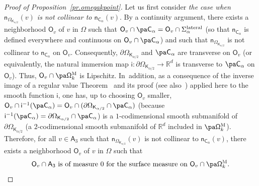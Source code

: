 \begin{proof}[Proof of Proposition~\ref{pr.omegakpoint}]
Let us first consider \emph{the case when $\mathsf n_{\Omega_{\mathsf K_{\alpha/2}}}(v)$ is not collinear to $\mathsf n_{\mathsf C_\alpha}(v)$}. By a continuity argument, there exists a neighborhood $\mathsf O_v$ of $v$ in $\Omega$ such that $\mathsf O_v\cap \pa \mathsf C_\alpha=\mathsf O_v\cap \Sigma_\alpha^{\textup{lateral}}$ (so that $\mathsf n_{\mathsf C_\alpha}$ is defined everywhere and continuous on $\mathsf O_v\cap \pa \mathsf C_\alpha$) and such that $\mathsf n_{\Omega_{\mathsf K_{\alpha/2}}}$ is not collinear to $\mathsf n_{\mathsf C_\alpha}$ on $\mathsf O_v$. Consequently, $ \partial \Omega_{\mathsf K_{\alpha/2}}$ and $ \pa \mathsf C_\alpha$ are transverse on $\mathsf O_v$ (or equivalently, the natural immersion map $\mathsf i: \partial \Omega_{\mathsf K_{\alpha/2}}\to \mathbb R^d$ is transverse to $ \pa \mathsf C_\alpha$ on $\mathsf O_v$). Thus, $\mathsf O_v\cap \pa \mathsf \Omega_k^{\textsc{M}}$ is Lipschitz. In~addition, as a consequence of the inverse image of a regular value Theorem~\cite[Th.\,(5.12)]{brocker1982introduction} and its proof (see also~\cite{thom1954quelques,milnor1997topology,guillemin2010differential})
applied here to the smooth function $\mathsf i$, one has, up to choosing $\mathsf O_v$ smaller, $\mathsf O_v \cap \mathsf i^{-1}(\pa \mathsf C_\alpha)= \mathsf O_v\cap (\partial \Omega_{\mathsf K_{\alpha/2}}\cap \pa \mathsf C_\alpha)$ (because $\mathsf i^{-1}(\pa \mathsf C_\alpha)= \partial \Omega_{\mathsf K_{\alpha/2}}\cap \pa \mathsf C_\alpha$) is a $1$-codimensional smooth submanifold of $\partial \Omega_{\mathsf K_{\alpha/2}}$ (\ie a $2$-codimensional smooth submanifold of $\mathbb R^d$ included in $\pa \mathsf \Omega_k^{\textsc{M}}$).
Therefore, for all $v\in \mathsf A_3$ such that $\mathsf n_{\Omega_{\mathsf K_{\alpha/2}}}(v)$ is not collinear to $\mathsf n_{\mathsf C_\alpha}(v)$, there exists a neighborhood $\mathsf O_v$ of $v$ in $\Omega$ such that
\begin{equation}\label{eq.point1A3}
\text{$\mathsf O_v\cap \mathsf A_3$ is of measure $0$ for the surface measure on $\mathsf O_v\cap \pa \mathsf \Omega_k^{\textsc{M}}$}.
\end{equation}


\end{proof}
